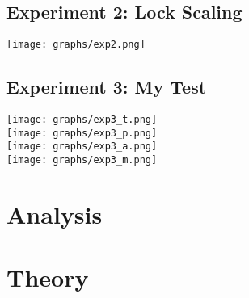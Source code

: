 \documentclass[]{article}
\begin{document}
\subsection{Experiment 2: Lock Scaling}
\texttt{[image: graphs/exp2.png]}\\
\subsection{Experiment 3: My Test}
\texttt{[image: graphs/exp3\_t.png]}\\
\texttt{[image: graphs/exp3\_p.png]}\\
\texttt{[image: graphs/exp3\_a.png]}\\
\texttt{[image: graphs/exp3\_m.png]}\\

\section{Analysis}

\section{Theory}
	
\end{document}
